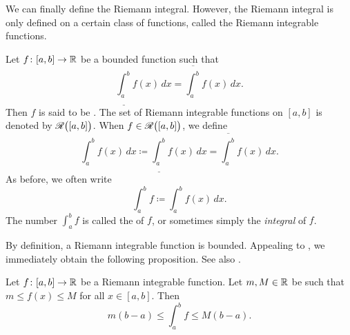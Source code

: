 We can finally define the Riemann integral.  However, the Riemann
integral is only defined on a certain class of functions, called the
Riemann integrable functions.

\begin{defn}
Let $f \colon [a,b] \to {\mathbb{R}}$ be a bounded function such that
\begin{equation*}
\underline{\int_a^b} f(x)\,dx = \overline{\int_a^b} f(x)\,dx .
\end{equation*}
Then $f$ is said to be \emph{}.
The set of Riemann integrable functions on $[a,b]$ is denoted
by ${\mathscr{R}}\bigl([a,b]\bigr)$.
When $f \in {\mathscr{R}}\bigl([a,b]\bigr)$, we define
\begin{equation*}
\int_a^b f(x)\,dx \coloneqq 
\underline{\int_a^b} f(x)\,dx = \overline{\int_a^b} f(x)\,dx .
\end{equation*}
As before, we often write
\begin{equation*}
\int_a^b f \coloneqq \int_a^b f(x)\,dx.
\end{equation*}
The number $\int_a^b f$ is called the \emph{}
of $f$, or sometimes simply the \emph{integral} of $f$.
\end{defn}

By definition, a Riemann integrable function is bounded.
Appealing to , we immediately obtain
the following proposition.  See also .

\begin{prop} \label{intbound:prop}
Let $f \colon [a,b] \to {\mathbb{R}}$ be a Riemann integrable function.
Let $m, M \in {\mathbb{R}}$ be 
such that $m \leq f(x) \leq M$ for all $x \in [a,b]$.  Then
\begin{equation*}
m(b-a) \leq
\int_a^b f
\leq M(b-a) .
\end{equation*}
\end{prop}
\begin{myfigureht}
\caption{The area under the curve is bounded from above by
the area of the entire rectangle, $M(b-a)$, and from below by
the area of the shaded part, $m(b-a)$.\label{fig:integralminmax}}
\end{myfigureht}


